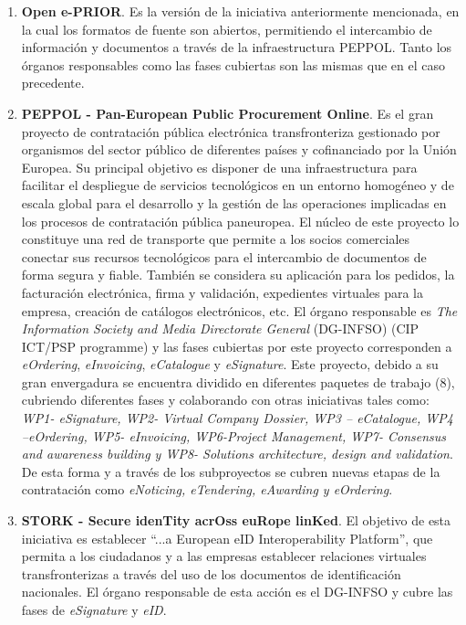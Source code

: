 \begin{enumerate}
{ORdering}) en octubre del año 2009. Los órganos responsables son el \gls{DG-MARKT} y \gls{DIGIT} cubriendo
las fases o temas de \textit{eInvoicing}, \textit{eOrdering} y \textit{eCatalogues}.
\item \textbf{Open e-PRIOR}. Es la versión de la iniciativa anteriormente mencionada, 
en la cual los formatos de fuente son abiertos, permitiendo el intercambio
de información y documentos a través de la infraestructura \gls{PEPPOL}. Tanto los
órganos responsables como las fases cubiertas son las mismas que en el caso precedente.
\item \textbf{PEPPOL - Pan-European Public Procurement Online}. Es el gran proyecto
de contratación pública electrónica transfronteriza gestionado por organismos del 
sector público de diferentes países y cofinanciado por la Unión \gls{Europea}. Su principal
objetivo es disponer de una infraestructura para facilitar el despliegue de servicios
tecnológicos en un entorno homogéneo y de escala global para el desarrollo y la gestión
de las operaciones implicadas en los procesos de contratación pública paneuropea. El núcleo
de este proyecto lo constituye una red de transporte que permite a los socios comerciales
conectar sus recursos tecnológicos para el intercambio de documentos de forma segura
y fiable. También se considera su aplicación para los pedidos, la facturación 
electrónica, firma y validación, expedientes virtuales para la empresa, creación
de catálogos electrónicos, etc. El órgano responsable es \textit{The Information Society and Media Directorate General} (\gls{DG-INFSO}) (CIP ICT/PSP programme)
y las fases cubiertas por este proyecto corresponden a \textit{eOrdering}, \textit{eInvoicing}, 
\textit{eCatalogue} y \textit{eSignature}. Este proyecto, debido a su gran envergadura se encuentra
dividido en diferentes paquetes de trabajo (8), cubriendo diferentes fases y colaborando
con otras iniciativas tales como: \textit{WP1- eSignature, WP2- Virtual Company Dossier, WP3 – eCatalogue,
WP4 –eOrdering, WP5- eInvoicing, WP6-Project Management, WP7- Consensus and awareness building
y WP8- Solutions architecture, design and validation}. De esta forma y a través
de los subproyectos se cubren nuevas etapas de la contratación como  
\textit{eNoticing, eTendering, eAwarding y eOrdering}.
\item \textbf{\gls{STORK} - Secure idenTity acrOss euRope linKed}. El objetivo de esta iniciativa
es establecer ``...a European eID Interoperability Platform'', que permita a los ciudadanos y 
a las empresas establecer relaciones virtuales transfronterizas a través del uso 
de los documentos de identificación nacionales. El órgano responsable de esta acción
es el \gls{DG-INFSO} y cubre las fases de \textit{eSignature} y \textit{eID}.


\end{enumerate}
